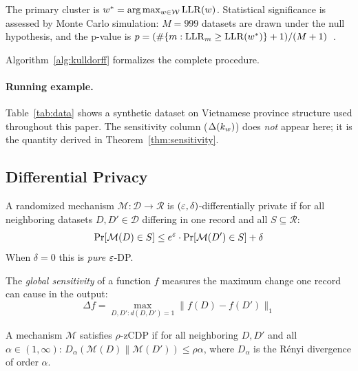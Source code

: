 The primary cluster is $w^* = \arg\max_{w \in \mathcal{W}} \mathrm{LLR}(w)$.
Statistical significance is assessed by Monte Carlo simulation: $M = 999$ datasets
are drawn under the null hypothesis, and the p-value is
$p = (\#\{m : \mathrm{LLR}_m \geq \mathrm{LLR}(w^*)\} + 1) / (M + 1)$~\cite{kulldorff1997}.

Algorithm~\ref{alg:kulldorff} formalizes the complete procedure.




\paragraph{Running example.}
Table~\ref{tab:data} shows a synthetic dataset on Vietnamese province structure
used throughout this paper.
The sensitivity column ($\Delta(k_w)$) does \emph{not} appear here; it is the quantity
derived in Theorem~\ref{thm:sensitivity}.




\subsection{Differential Privacy}
\label{sec:background:dp}

\begin{definition}
A randomized mechanism $\mathcal{M}: \mathcal{D} \to \mathcal{R}$ is
$(\varepsilon, \delta)$-differentially private if for all neighboring datasets
$D, D' \in \mathcal{D}$ differing in one record and all $S \subseteq \mathcal{R}$:
\[
    \Pr[\mathcal{M}(D) \in S] \leq e^\varepsilon \cdot \Pr[\mathcal{M}(D') \in S] + \delta
\]
When $\delta = 0$ this is \emph{pure} $\varepsilon$-DP.
\end{definition}

The \emph{global sensitivity} of a function $f$ measures the maximum change one
record can cause in the output:
\[
    \Delta f = \max_{D, D' : d(D,D') = 1} \|f(D) - f(D')\|_1
\]

\begin{definition}
A mechanism $\mathcal{M}$ satisfies $\rho$-zCDP if for all neighboring $D, D'$
and all $\alpha \in (1, \infty)$:
\(D_\alpha(\mathcal{M}(D) \| \mathcal{M}(D')) \leq \rho\alpha\),
where $D_\alpha$ is the R\'{e}nyi divergence of order $\alpha$.
\end{definition}

